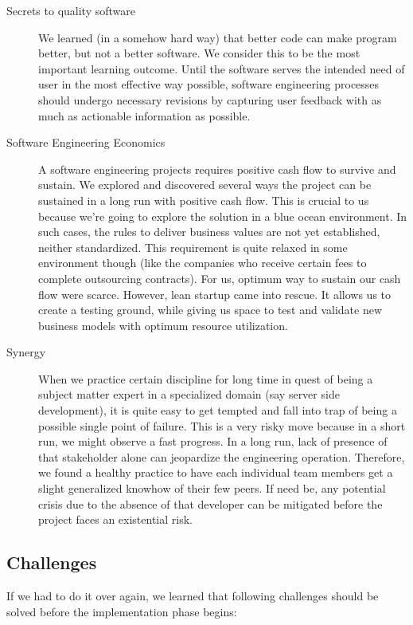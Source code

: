 \begin{description}
	\item[Secrets to quality software] We learned (in a somehow hard way) that better code can make program better, but not a better software. We consider this to be the most important learning outcome. Until the software serves the intended need of user in the most effective way possible, software engineering processes should undergo necessary revisions by capturing user feedback with as much as actionable information as possible. %
	\item[Software Engineering Economics] A software engineering projects requires positive cash flow to survive and sustain. We explored and discovered several ways the project can be sustained in a long run with positive cash flow. This is crucial to us because we're going to explore the solution in a blue ocean environment. In such cases, the rules to deliver business values are not yet established, neither standardized. This requirement is quite relaxed in some environment though (like the companies who receive certain fees to complete outsourcing contracts). For us, optimum way to sustain our cash flow were scarce. However, lean startup came into rescue. It allows us to create a testing ground, while giving us space to test and validate new business models with optimum resource utilization.
	\item[Synergy] When we practice certain discipline for long time in quest of being a subject matter expert in a specialized domain (say server side development), it is quite easy to get tempted and fall into trap of being a possible single point of failure. This is a very risky move because in a short run, we might observe a fast progress. In a long run, lack of presence of that stakeholder alone can jeopardize the engineering operation. Therefore, we found a healthy practice to have each individual team members get a slight generalized knowhow of their few peers. If need be, any potential crisis due to the absence of that developer can be mitigated before the project faces an existential risk.
\end{description}

\subsection{Challenges}

If we had to do it over again, we learned that following challenges should be solved before the implementation phase begins:

